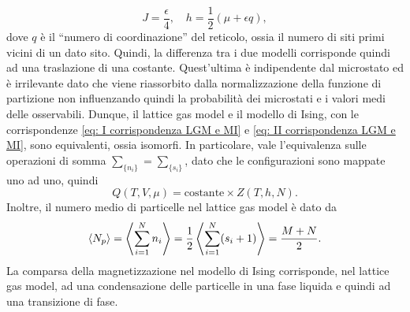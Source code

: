 \begin{equation}
\label{eq: II corrispondenza LGM e MI}
    J = \frac{\epsilon}{4},\quad h = \frac{1}{2}(\mu + \epsilon q),
\end{equation}
dove $q$ è il ``numero di coordinazione'' del reticolo, ossia il numero di siti primi vicini di un dato sito. Quindi, la differenza tra i due modelli corrisponde quindi ad una traslazione di una costante. Quest'ultima è indipendente dal microstato ed è irrilevante dato che viene riassorbito dalla normalizzazione della funzione di partizione non influenzando quindi la probabilità dei microstati e i valori medi delle osservabili. Dunque, il lattice gas model e il modello di Ising, con le corrispondenze \eqref{eq: I corrispondenza LGM e MI} e \eqref{eq: II corrispondenza LGM e MI}, sono equivalenti, ossia isomorfi. In particolare, vale l'equivalenza sulle operazioni di somma $\sum_{\{n_i\}} = \sum_{\{s_i\}}$, dato che le configurazioni sono mappate uno ad uno, quindi
\begin{equation}
    Q(T,V,\mu) = \mathrm{costante}\times Z(T,h,N).
\end{equation}
Inoltre, il numero medio di particelle nel lattice gas model è dato da
\begin{equation}
    \langle N_p \rangle = \left\langle \sum_{i=1}^Nn_i \right\rangle = \frac{1}{2}\left\langle \sum_{i=1}^N(s_i + 1) \right\rangle = \frac{M + N}{2}.
\end{equation}
La comparsa della magnetizzazione nel modello di Ising corrisponde, nel lattice gas model, ad una condensazione delle particelle in una fase liquida e quindi ad una transizione di fase. 

